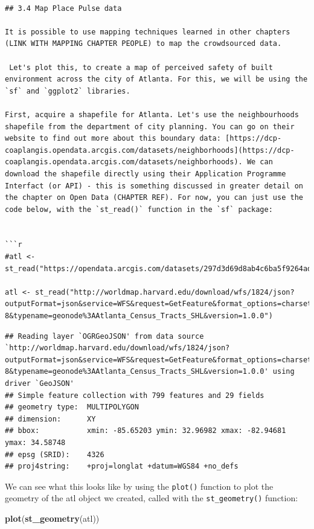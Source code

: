 \documentclass[
]{article}
\newenvironment{Shaded}{\begin{snugshade}}{\end{snugshade}}
\newcommand{\KeywordTok}[1]{\textcolor[rgb]{0.13,0.29,0.53}{\textbf{#1}}}
\newcommand{\NormalTok}[1]{#1}
\begin{document}
\begin{verbatim}

## 3.4 Map Place Pulse data

It is possible to use mapping techniques learned in other chapters (LINK WITH MAPPING CHAPTER PEOPLE) to map the crowdsourced data. 

 Let's plot this, to create a map of perceived safety of built environment across the city of Atlanta. For this, we will be using the `sf` and `ggplot2` libraries. 

First, acquire a shapefile for Atlanta. Let's use the neighbourhoods shapefile from the department of city planning. You can go on their website to find out more about this boundary data: [https://dcp-coaplangis.opendata.arcgis.com/datasets/neighborhoods](https://dcp-coaplangis.opendata.arcgis.com/datasets/neighborhoods). We can download the shapefile directly using their Application Programme Interfact (or API) - this is something discussed in greater detail on the chapter on Open Data (CHAPTER REF). For now, you can just use the code below, with the `st_read()` function in the `sf` package: 


```r
#atl <- st_read("https://opendata.arcgis.com/datasets/297d3d69d8ab4c6ba5f9264ad5e75c0a_3.geojson")

atl <- st_read("http://worldmap.harvard.edu/download/wfs/1824/json?outputFormat=json&service=WFS&request=GetFeature&format_options=charset%3AUTF-8&typename=geonode%3AAtlanta_Census_Tracts_SHL&version=1.0.0")
\end{verbatim}

\begin{verbatim}
## Reading layer `OGRGeoJSON' from data source `http://worldmap.harvard.edu/download/wfs/1824/json?outputFormat=json&service=WFS&request=GetFeature&format_options=charset%3AUTF-8&typename=geonode%3AAtlanta_Census_Tracts_SHL&version=1.0.0' using driver `GeoJSON'
## Simple feature collection with 799 features and 29 fields
## geometry type:  MULTIPOLYGON
## dimension:      XY
## bbox:           xmin: -85.65203 ymin: 32.96982 xmax: -82.94681 ymax: 34.58748
## epsg (SRID):    4326
## proj4string:    +proj=longlat +datum=WGS84 +no_defs
\end{verbatim}

We can see what this looks like by using the \texttt{plot()} function to
plot the geometry of the atl object we created, called with the
\texttt{st\_geometry()} function:

\begin{Shaded}
\begin{Highlighting}[]
\KeywordTok{plot}\NormalTok{(}\KeywordTok{st_geometry}\NormalTok{(atl))}
\end{Highlighting}
\end{Shaded}
\end{document}
